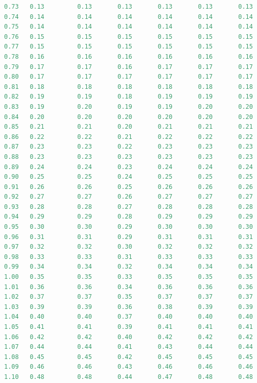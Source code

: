\documentclass[12pt]{report}
\begin{document}
\begin{lstlisting}[language=Python]
0.73   0.13         0.13       0.13       0.13       0.13       0.13
0.74   0.14         0.14       0.14       0.14       0.14       0.14
0.75   0.14         0.14       0.14       0.14       0.14       0.14
0.76   0.15         0.15       0.15       0.15       0.15       0.15
0.77   0.15         0.15       0.15       0.15       0.15       0.15
0.78   0.16         0.16       0.16       0.16       0.16       0.16
0.79   0.17         0.17       0.16       0.17       0.17       0.17
0.80   0.17         0.17       0.17       0.17       0.17       0.17
0.81   0.18         0.18       0.18       0.18       0.18       0.18
0.82   0.19         0.19       0.18       0.19       0.19       0.19
0.83   0.19         0.20       0.19       0.19       0.20       0.20
0.84   0.20         0.20       0.20       0.20       0.20       0.20
0.85   0.21         0.21       0.20       0.21       0.21       0.21
0.86   0.22         0.22       0.21       0.22       0.22       0.22
0.87   0.23         0.23       0.22       0.23       0.23       0.23
0.88   0.23         0.23       0.23       0.23       0.23       0.23
0.89   0.24         0.24       0.23       0.24       0.24       0.24
0.90   0.25         0.25       0.24       0.25       0.25       0.25
0.91   0.26         0.26       0.25       0.26       0.26       0.26
0.92   0.27         0.27       0.26       0.27       0.27       0.27
0.93   0.28         0.28       0.27       0.28       0.28       0.28
0.94   0.29         0.29       0.28       0.29       0.29       0.29
0.95   0.30         0.30       0.29       0.30       0.30       0.30
0.96   0.31         0.31       0.29       0.31       0.31       0.31
0.97   0.32         0.32       0.30       0.32       0.32       0.32
0.98   0.33         0.33       0.31       0.33       0.33       0.33
0.99   0.34         0.34       0.32       0.34       0.34       0.34
1.00   0.35         0.35       0.33       0.35       0.35       0.35
1.01   0.36         0.36       0.34       0.36       0.36       0.36
1.02   0.37         0.37       0.35       0.37       0.37       0.37
1.03   0.39         0.39       0.36       0.38       0.39       0.39
1.04   0.40         0.40       0.37       0.40       0.40       0.40
1.05   0.41         0.41       0.39       0.41       0.41       0.41
1.06   0.42         0.42       0.40       0.42       0.42       0.42
1.07   0.44         0.44       0.41       0.43       0.44       0.44
1.08   0.45         0.45       0.42       0.45       0.45       0.45
1.09   0.46         0.46       0.43       0.46       0.46       0.46
1.10   0.48         0.48       0.44       0.47       0.48       0.48

\end{lstlisting}
\end{document}
